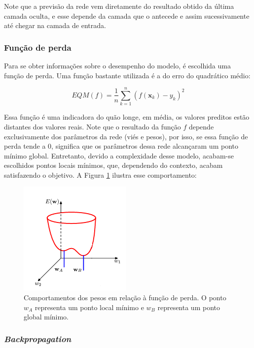 Note que a previsão da rede vem diretamente do resultado obtido da última camada oculta, e esse depende da camada que o antecede e assim sucessivamente até chegar na camada de entrada.


\subsubsection{Função de perda}

Para se obter informações sobre o desempenho do modelo, é escolhida uma função de perda. Uma função bastante utilizada é a do erro do quadrático médio:

\[EQM(f) = \frac{1}{n} \sum_{k=1}^{n} (f(\textbf{x}_k) - y_k)^2\]

Essa função é uma indicadora do quão longe, em média, os valores preditos estão distantes dos valores reais. Note que o resultado da função $f$ depende exclusivamente dos parâmetros da rede (viés e pesos), por isso, se essa função de perda tende a 0, significa que  os parâmetros dessa rede alcançaram um ponto mínimo global. Entretanto, devido a complexidade desse modelo, acabam-se escolhidos pontos locais mínimos, que, dependendo do contexto, acabam satisfazendo o objetivo. A Figura \ref{fig:pesos_lossfunc} ilustra esse comportamento:

\begin{figure}[H]
    \centering
    \includegraphics[scale=1]{imagens/pesos_loss_func.png}
    \caption{Comportamentos dos pesos em relação à função de perda. O ponto $w_A$ representa um ponto local mínimo e $w_B$ representa um ponto global mínimo. \cite{bishop2006pattern}}
    \label{fig:pesos_lossfunc}
    
\end{figure}

\subsubsection{\textit{Backpropagation}}

